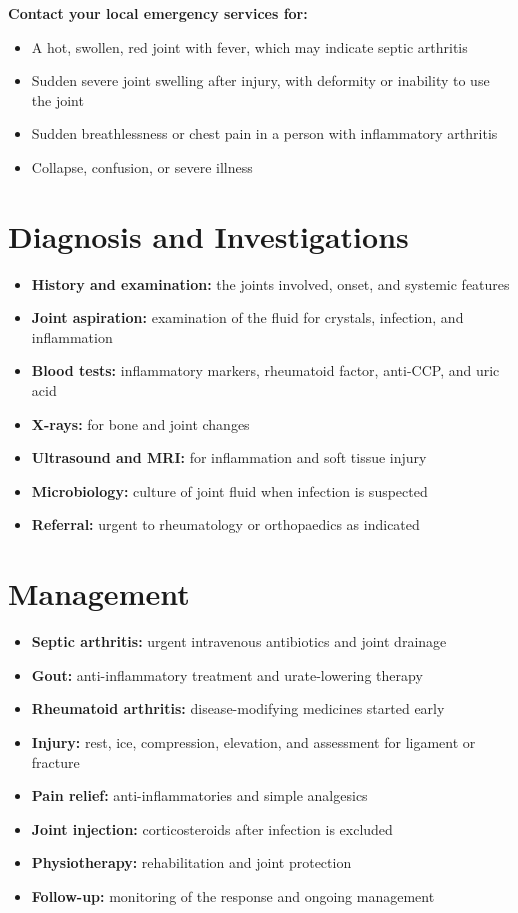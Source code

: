 \textbf{Contact your local emergency services for:}
\begin{itemize}
    \item A hot, swollen, red joint with fever, which may indicate septic arthritis
    \item Sudden severe joint swelling after injury, with deformity or inability to use the joint
    \item Sudden breathlessness or chest pain in a person with inflammatory arthritis
    \item Collapse, confusion, or severe illness
\end{itemize}

\section*{Diagnosis and Investigations}
\begin{itemize}
    \item \textbf{History and examination:} the joints involved, onset, and systemic features
    \item \textbf{Joint aspiration:} examination of the fluid for crystals, infection, and inflammation
    \item \textbf{Blood tests:} inflammatory markers, rheumatoid factor, anti-CCP, and uric acid
    \item \textbf{X-rays:} for bone and joint changes
    \item \textbf{Ultrasound and MRI:} for inflammation and soft tissue injury
    \item \textbf{Microbiology:} culture of joint fluid when infection is suspected
    \item \textbf{Referral:} urgent to rheumatology or orthopaedics as indicated
\end{itemize}

\section*{Management}
\begin{itemize}
    \item \textbf{Septic arthritis:} urgent intravenous antibiotics and joint drainage
    \item \textbf{Gout:} anti-inflammatory treatment and urate-lowering therapy
    \item \textbf{Rheumatoid arthritis:} disease-modifying medicines started early
    \item \textbf{Injury:} rest, ice, compression, elevation, and assessment for ligament or fracture
    \item \textbf{Pain relief:} anti-inflammatories and simple analgesics
    \item \textbf{Joint injection:} corticosteroids after infection is excluded
    \item \textbf{Physiotherapy:} rehabilitation and joint protection
    \item \textbf{Follow-up:} monitoring of the response and ongoing management
\end{itemize}

